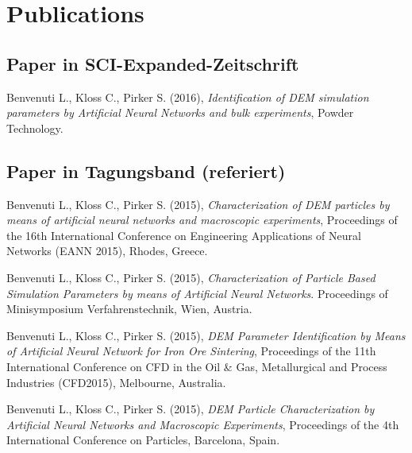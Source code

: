 \chapter*{Publications}
\label{cap:publications}
\section*{Paper in SCI-Expanded-Zeitschrift}

\noindent
Benvenuti L., Kloss C., Pirker S. (2016), \emph{Identification of DEM simulation
parameters by Artificial Neural Networks and bulk experiments}, Powder Technology.
\vspace{1ex}


\section*{Paper in Tagungsband (referiert)}

\noindent
Benvenuti L., Kloss C., Pirker S. (2015), \emph{Characterization of DEM
particles by means of artificial neural networks and macroscopic experiments},
Proceedings of the 16th International Conference on Engineering Applications of
Neural Networks (EANN 2015), Rhodes, Greece.
\vspace{1ex}

\noindent
Benvenuti L., Kloss C., Pirker S. (2015), \emph{Characterization of Particle
Based Simulation Parameters by means of Artificial Neural Networks}.
Proceedings of Minisymposium Verfahrenstechnik, Wien, Austria.
\vspace{1ex}

\noindent
Benvenuti L., Kloss C., Pirker S. (2015), \emph{DEM Parameter Identification by
Means of Artificial Neural Network for Iron Ore Sintering}, Proceedings of the
11th International Conference on CFD in the Oil \& Gas, Metallurgical and
Process Industries (CFD2015), Melbourne, Australia.
\vspace{1ex}

\noindent
Benvenuti L., Kloss C., Pirker S. (2015), \emph{DEM Particle Characterization by
Artificial Neural Networks and Macroscopic Experiments}, Proceedings of the 4th
International Conference on Particles, Barcelona, Spain.
\vspace{1ex}


